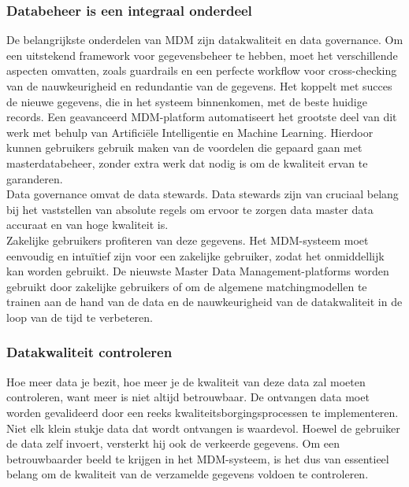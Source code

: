 \subsubsection{Databeheer is een integraal onderdeel}
De belangrijkste onderdelen van MDM zijn datakwaliteit en data governance. Om een uitstekend framework voor gegevensbeheer te hebben, moet het verschillende aspecten omvatten, zoals guardrails en een perfecte workflow voor cross-checking van de nauwkeurigheid en redundantie van de gegevens. Het koppelt met succes de nieuwe gegevens, die in het systeem binnenkomen, met de beste huidige records. Een geavanceerd MDM-platform automatiseert het grootste deel van dit werk met behulp van Artificiële Intelligentie en Machine Learning. Hierdoor kunnen gebruikers gebruik maken van de voordelen die gepaard gaan met masterdatabeheer, zonder extra werk dat nodig is om de kwaliteit ervan te garanderen. 
\\Data governance omvat de data stewards. Data stewards zijn van cruciaal belang bij het vaststellen van absolute regels om ervoor te zorgen data master data accuraat en van hoge kwaliteit is. 
\\Zakelijke gebruikers profiteren van deze gegevens. Het MDM-systeem moet eenvoudig en intuïtief zijn voor een zakelijke gebruiker, zodat het onmiddellijk kan worden gebruikt. De nieuwste Master Data Management-platforms worden gebruikt door zakelijke gebruikers of om de algemene matchingmodellen te trainen aan de hand van de data en de nauwkeurigheid van de datakwaliteit in de loop van de tijd te verbeteren.

\subsubsection{Datakwaliteit controleren}
Hoe meer data je bezit, hoe meer je de kwaliteit van deze data zal moeten controleren, want meer is niet altijd betrouwbaar. De ontvangen data moet worden gevalideerd door een reeks kwaliteitsborgingsprocessen te implementeren. Niet elk klein stukje data dat wordt ontvangen is waardevol. Hoewel de gebruiker de data zelf invoert, versterkt hij ook de verkeerde gegevens. Om een betrouwbaarder beeld te krijgen in het MDM-systeem, is het dus van essentieel belang om de kwaliteit van de verzamelde gegevens voldoen te controleren. 

